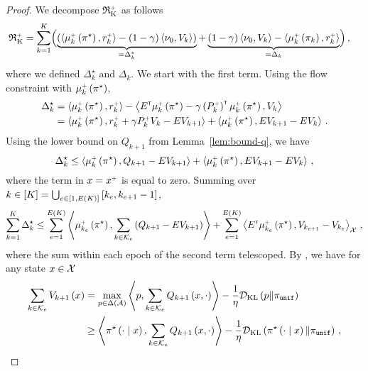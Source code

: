 \begin{proof}
    We decompose $\operatorname{\mathfrak{R}_K^\mathsf{\scriptscriptstyle +}}$ as follows
    \begin{align*}
        \operatorname{\mathfrak{R}_K^\mathsf{\scriptscriptstyle +}} &= \sum_{k=1}^K \Bigl(\underbrace{\left( \left\langle \mu_k^{\mathsf{\scriptscriptstyle +}} \left( \pi^\star \right), r_k^{\mathsf{\scriptscriptstyle +}} \right\rangle - \left( 1 - \gamma \right) \left\langle \nu_0, V_k \right\rangle \right)}_{= \Delta_k^\star} + \underbrace{\left( 1 - \gamma \right) \left\langle \nu_0, V_k \right\rangle - \left\langle \mu_k^{\mathsf{\scriptscriptstyle +}} \left( \pi_k \right), r_k^{\mathsf{\scriptscriptstyle +}} \right\rangle}_{= \Delta_k}\Bigr)\,,
    \end{align*}
    where we defined $\Delta_k^\star$ and $\Delta_k$. We start with the first term. Using the flow constraint with $\mu_k^{\mathsf{\scriptscriptstyle +}} \left( \pi^\star \right)$,
    \begin{align*}
        \Delta_k^\star &= \left\langle \mu_k^{\mathsf{\scriptscriptstyle +}} \left( \pi^\star \right), r_k^{\mathsf{\scriptscriptstyle +}} \right\rangle - \left\langle E^\mathsf{\scriptscriptstyle T} \mu_k^{\mathsf{\scriptscriptstyle +}} \left( \pi^\star \right) - \gamma \left( P_k^\mathsf{\scriptscriptstyle +} \right)^\mathsf{\scriptscriptstyle T} \mu_k^{\mathsf{\scriptscriptstyle +}} \left( \pi^\star \right), V_k \right\rangle \\
        &= \left\langle \mu_k^{\mathsf{\scriptscriptstyle +}} \left( \pi^\star \right), r_k^{\mathsf{\scriptscriptstyle +}} + \gamma P_k^\mathsf{\scriptscriptstyle +} V_k - E V_{k+1} \right\rangle + \left\langle \mu_k^{\mathsf{\scriptscriptstyle +}} \left( \pi^\star \right), E V_{k+1} - E V_k \right\rangle\,.
    \end{align*}
    Using the lower bound on $Q_{k+1}$ from Lemma~\ref{lem:bound-q}, we have
    \begin{equation*}
        \Delta_k^\star \leq \left\langle \mu_k^{\mathsf{\scriptscriptstyle +}} \left( \pi^\star \right), Q_{k+1} - E V_{k+1} \right\rangle + \left\langle \mu_k^{\mathsf{\scriptscriptstyle +}} \left( \pi^\star \right), E V_{k+1} - E V_k \right\rangle\,,
    \end{equation*}
    where the term in $x = x^{\mathsf{\scriptscriptstyle +}}$ is equal to zero. Summing over $k \in \left[ K \right] = \bigcup_{e \in \left[ 1, E \left( K \right) \right]} \left[ k_e, k_{e+1} - 1 \right]$,
    \begin{equation*}
        \sum_{k=1}^K \Delta_k^\star \leq \sum_{e=1}^{E \left( K \right)} \left\langle \mu_{k_e}^{\mathsf{\scriptscriptstyle +}} \left( \pi^\star \right), \sum_{k \in \mathcal{K}_e} \left( Q_{k+1} - E V_{k+1} \right) \right\rangle + \sum_{e=1}^{E \left( K \right)} \left\langle E^\mathsf{\scriptscriptstyle T} \mu_{k_e}^{\mathsf{\scriptscriptstyle +}} \left( \pi^\star \right), V_{k_{e+1}} - V_{k_e} \right\rangle_{\mathcal{X}}\,,
    \end{equation*}
    where the sum within each epoch of the second term telescoped. By \citealp[Lemma~C.1]{MN23}, we have for any state $x \in \mathcal{X}$
    \begin{align*}
        \sum_{k \in \cK_e} V_{k+1} \spr{x} &= \max_{p \in \Delta \spr{\cA}} \inp{p, \sum_{k \in \cK_e} Q_{k+1} \spr{x, \cdot}} - \frac1\eta \KL \spr{p \| \piunif} \\
        &\geq \inp{\pi^\star \spr{\cdot \given x}, \sum_{k \in \cK_e} Q_{k+1} \spr{x, \cdot}} - \frac1\eta \KL \spr{\pi^\star \spr{\cdot \given x} \| \piunif}\,,

\end{align*}
\end{proof}
